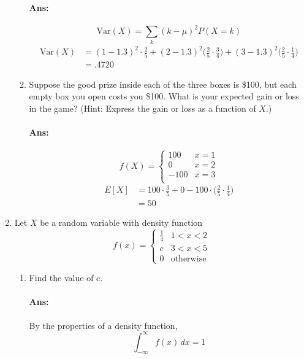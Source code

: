 \documentclass[letterpaper,12pt]{article}
\begin{document}
\begin{enumerate}
\begin{enumerate}[label=(\alph*).]
            \paragraph{Ans:}
            \begin{equation}
                \mathrm{Var}(X) = \sum_k (k-\mu)^2 P(X=k)
            \end{equation}
            \begin{align*}
                \mathrm{Var}(X) &= (1-1.3)^2\cdot\frac{2}{5}+(2-1.3)^2\bigg(\frac{2}{5}\cdot \frac{3}{4}\bigg) + (3-1.3)^2\bigg(\frac{2}{5}\cdot \frac{1}{4}\bigg)\\
                                &= .4720
            \end{align*}
        \item Suppose the good prize inside each of the three boxes is \$100, but each empty box
you open costs you \$100. What is your expected gain or loss in the game? (Hint:
Express the gain or loss as a function of $X$.)
\paragraph{Ans:}
\[ f(X) = \begin{cases}
    100 & x = 1 \\
    0 & x = 2 \\
    -100 & x = 3 \\
    \end{cases}
\]
\begin{align*}
    E[X] &= 100\cdot\frac{3}{5} + 0 -100\cdot\bigg(\frac{2}{5}\cdot\frac{1}{4}\bigg)\\
         &= 50
\end{align*}
    \end{enumerate}
\item Let $X$ be a random variable with density function
    \[ f(x) = \begin{cases}
        \frac{1}{4} & 1 <x<2 \\
        c & 3 < x < 5\\
        0 & \mathrm{otherwise}
        \end{cases}
    \]
    \begin{enumerate}[label=(\alph*).]
        \item Find the value of c.
            \paragraph{Ans:} By the properties of a density function,
            \[
                \int_{-\infty}^{\infty} f(x)\,dx = 1
            \]

\end{enumerate}
\end{enumerate}
\end{document}
